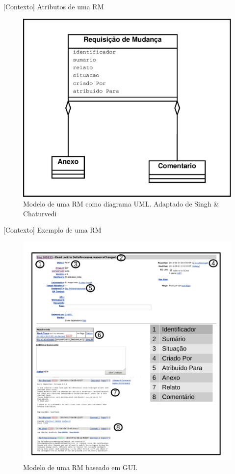 \documentclass[t,14pt,mathserif]{beamer}
\begin{document}
\begin{frame}{[Contexto] Atributos de uma RM}

    \begin{figure}[htpb]
        \centering
        \includegraphics[width=0.55\linewidth]{../img/diagrama-classe-atributos-requisicao-mudancas.pdf}
        \caption{Modelo de uma RM como diagrama UML\@. Adaptado
            de Singh \& Chaturvedi~\cite{singh2011bug}}
\label{fig:diagrama-classe-atributos-requisicao-mudancas}
    \end{figure}

\end{frame}

\begin{frame}{[Contexto] Exemplo de uma RM}

    \begin{figure}[htpb]
        \centering
        \includegraphics[width=0.5\linewidth]{../img/rm-exemplo.pdf}
        \caption{Modelo de uma RM baseado em GUI.}
\label{fig:rm-exemplo}
    \end{figure}

\end{frame}
\end{document}
